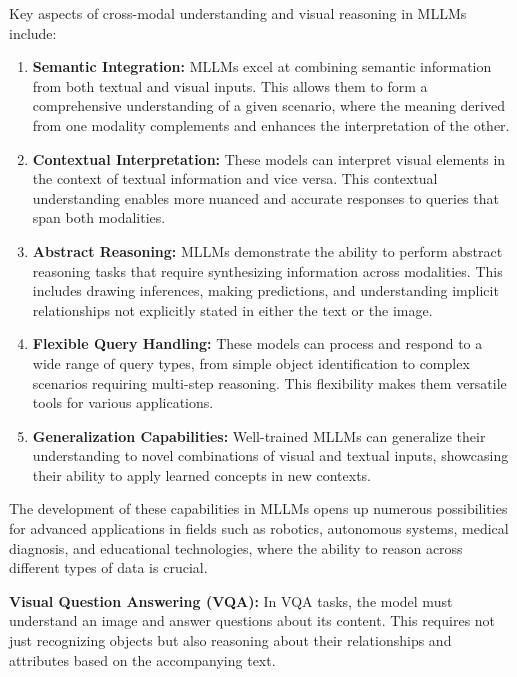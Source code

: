 Key aspects of cross-modal understanding and visual reasoning in MLLMs include:
\begin{enumerate}
    \item \textbf{Semantic Integration:} MLLMs excel at combining semantic information from both textual and visual inputs. This allows them to form a comprehensive understanding of a given scenario, where the meaning derived from one modality complements and enhances the interpretation of the other.
    \item \textbf{Contextual Interpretation:} These models can interpret visual elements in the context of textual information and vice versa. This contextual understanding enables more nuanced and accurate responses to queries that span both modalities.
    \item \textbf{Abstract Reasoning:} MLLMs demonstrate the ability to perform abstract reasoning tasks that require synthesizing information across modalities. This includes drawing inferences, making predictions, and understanding implicit relationships not explicitly stated in either the text or the image.
    \item \textbf{Flexible Query Handling:} These models can process and respond to a wide range of query types, from simple object identification to complex scenarios requiring multi-step reasoning. This flexibility makes them versatile tools for various applications.
    \item \textbf{Generalization Capabilities:} Well-trained MLLMs can generalize their understanding to novel combinations of visual and textual inputs, showcasing their ability to apply learned concepts in new contexts.
\end{enumerate}


The development of these capabilities in MLLMs opens up numerous possibilities for advanced applications in fields such as robotics, autonomous systems, medical diagnosis, and educational technologies, where the ability to reason across different types of data is crucial.

\textbf{Visual Question Answering (VQA):} In VQA tasks, the model must understand an image and answer questions about its content. This requires not just recognizing objects but also reasoning about their relationships and attributes based on the accompanying text.

